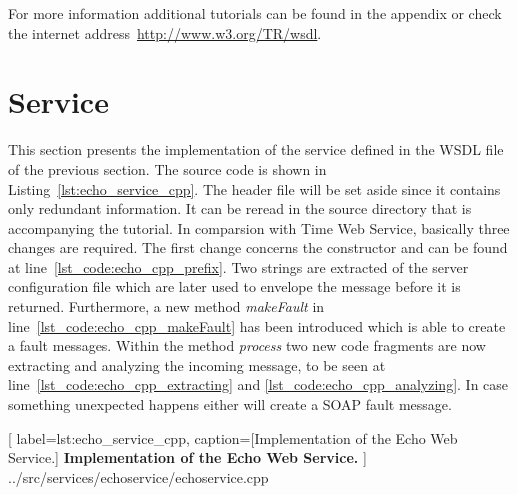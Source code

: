 For more information additional tutorials can be found in the appendix or check the internet address~\href{http://www.w3.org/TR/wsdl}{http://www.w3.org/TR/wsdl}.






\clearpage

\section{Service}

This section presents the implementation of the service defined in the WSDL file of the previous section.
The source code is shown in Listing~\ref{lst:echo_service_cpp}.
The header file will be set aside since it contains only redundant information. 
It can be reread in the source directory that is accompanying the tutorial.
In comparsion with Time Web Service, basically three changes are required.
The first change concerns the constructor and can be found at line~\ref{lst_code:echo_cpp_prefix}.
Two strings are extracted of the server configuration file which are later used to envelope the message before it is returned.
Furthermore, a new method \textit{makeFault} in line~\ref{lst_code:echo_cpp_makeFault} has been introduced which is able to create a fault messages.
Within the method \textit{process} two new code fragments are now extracting and analyzing the incoming message, to be seen at line~\ref{lst_code:echo_cpp_extracting} and \ref{lst_code:echo_cpp_analyzing}.
In case something unexpected happens either will create a SOAP fault message.\\


	[
	label=lst:echo_service_cpp,
	caption={[Implementation of the Echo Web Service.]
	\textbf{Implementation of the Echo Web Service.}}
	]
{../src/services/echoservice/echoservice.cpp}


